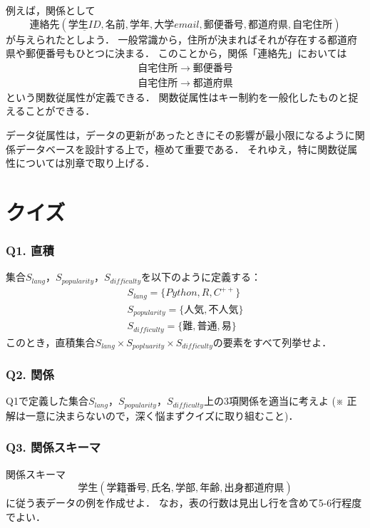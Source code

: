 例えば，関係として
\begin{equation}
連絡先(\underline{学生ID}, 名前, 学年, 大学email, 郵便番号, 都道府県, 自宅住所)
\end{equation}
が与えられたとしよう．
一般常識から，住所が決まればそれが存在する都道府県や郵便番号もひとつに決まる．
このことから，関係「連絡先」においては
\begin{eqnarray}
自宅住所 \to 郵便番号 \\
自宅住所 \to 都道府県
\end{eqnarray}
という関数従属性が定義できる．
関数従属性はキー制約を一般化したものと捉えることができる．

データ従属性は，データの更新があったときにその影響が最小限になるように関係データベースを設計する上で，極めて重要である．
それゆえ，特に関数従属性については別章で取り上げる．


\section{クイズ}
\subsubsection{Q1. 直積}
集合$S_{lang}$，$S_{popularity}$，$S_{difficulty}$を以下のように定義する：
\begin{eqnarray}
S_{lang} = \{Python, R, C^{++}\} \\
S_{popularity} = \{人気, 不人気\} \\
S_{difficulty} = \{難, 普通, 易\}
\end{eqnarray}
このとき，直積集合$S_{lang} \times S_{popluarity} \times S_{difficulty}$の要素をすべて列挙せよ．

\subsubsection{Q2. 関係}
Q1で定義した集合$S_{lang}$，$S_{popularity}$，$S_{difficulty}$上の3項関係を適当に考えよ
(※ 正解は一意に決まらないので，深く悩まずクイズに取り組むこと)．


\subsubsection{Q3. 関係スキーマ}
関係スキーマ
\begin{equation}
学生(\underline{学籍番号}, 氏名, 学部, 年齢, 出身都道府県)
\end{equation}
に従う表データの例を作成せよ．
なお，表の行数は見出し行を含めて5-6行程度でよい．


